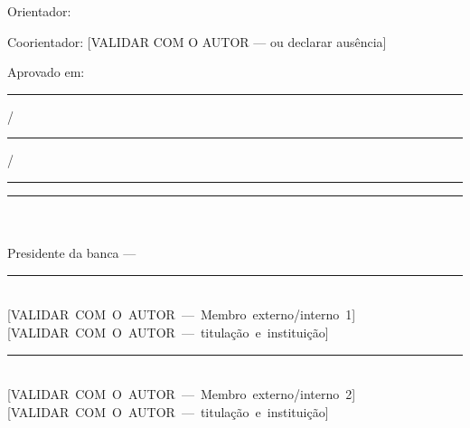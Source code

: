 \begin{folhadeaprovacao}
	\begin{center}

		\MakeUppercase{\TrabalhoAutor}

		\vspace{2.0cm}

		\makebox[\textwidth]{\textbf{\TrabalhoTitulo}}

		\vspace{1.5cm}

		\begin{flushright}
			\begin{minipage}{8.5cm}
				\small\SingleSpacing
				\TrabalhoNatureza
				\vspace{0.4cm}

				Orientador: \TrabalhoOrientador
				\vspace{0.4cm}

				Coorientador: [VALIDAR COM O AUTOR --- ou declarar ausência]
			\end{minipage}
		\end{flushright}

		\vspace{1.5cm}

		Aprovado em: \rule{1cm}{0.4pt}/\rule{1cm}{0.4pt}/\rule{1.5cm}{0.4pt}

		\vspace{1.5cm}

		\rule{10cm}{0.4pt}\\
		\TrabalhoOrientador\\
		Presidente da banca --- \TrabalhoInstituicao

		\vspace{1.2cm}

		\rule{10cm}{0.4pt}\\
		\mbox{[VALIDAR COM O AUTOR --- Membro externo/interno 1]}\\
		\mbox{[VALIDAR COM O AUTOR --- titulação e instituição]}

		\vspace{1.2cm}

		\rule{10cm}{0.4pt}\\
		\mbox{[VALIDAR COM O AUTOR --- Membro externo/interno 2]}\\
		\mbox{[VALIDAR COM O AUTOR --- titulação e instituição]}

	\end{center}
\end{folhadeaprovacao}


